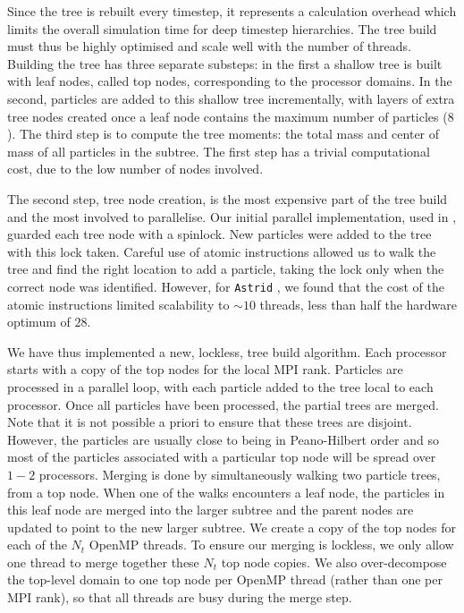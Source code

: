 \documentclass[fleqn,usenatbib]{mnras}
\def\astrid{\texttt{Astrid} }
\begin{document}
Since the tree is rebuilt every timestep, it represents a calculation overhead which limits the overall simulation time for deep timestep hierarchies. The tree build must thus be highly optimised and scale well with the number of threads. Building the tree has three separate substeps: in the first a shallow tree is built with leaf nodes, called top nodes, corresponding to the processor domains. In the second, particles are added to this shallow tree incrementally, with layers of extra tree nodes created once a leaf node contains the maximum number of particles ($8$). The third step is to compute the tree moments: the total mass and center of mass of all particles in the subtree. The first step has a trivial computational cost, due to the low number of nodes involved. 

The second step, tree node creation, is the most expensive part of the tree build and the most involved to parallelise. Our initial parallel implementation, used in \cite{Bird:2018}, guarded each tree node with a spinlock. New particles were added to the tree with this lock taken. Careful use of atomic instructions allowed us to walk the tree and find the right location to add a particle, taking the lock only when the correct node was identified. However, for \astrid, we found that the cost of the atomic instructions limited scalability to $\sim 10$ threads, less than half the hardware optimum of $28$.

We have thus implemented a new, lockless, tree build algorithm. Each processor starts with a copy of the top nodes for the local MPI rank. Particles are processed in a parallel loop, with each particle added to the tree local to each processor. Once all particles have been processed, the partial trees are merged. Note that it is not possible a priori to ensure that these trees are disjoint. However, the particles are usually close to being in Peano-Hilbert order and so most of the particles associated with a particular top node will be spread over $1-2$ processors. Merging is done by simultaneously walking two particle trees, from a top node. When one of the walks encounters a leaf node, the particles in this leaf node are merged into the larger subtree and the parent nodes are updated to point to the new larger subtree. We create a copy of the top nodes for each of the $N_t$ OpenMP threads. To ensure our merging is lockless, we only allow one thread to merge together these $N_t$ top node copies. We also over-decompose the top-level domain to one top node per OpenMP thread (rather than one per MPI rank), so that all threads are busy during the merge step. 
\end{document}
